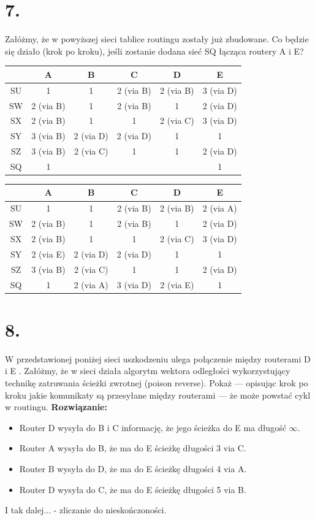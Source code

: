 \documentclass{article}
\begin{document}
\section*{7.}
Załóżmy, że w powyższej sieci tablice routingu zostały już zbudowane. Co będzie się działo (krok po kroku), jeśli zostanie dodana sieć SQ łącząca routery A i E?
\newline
\begin{tabular}{ |c|c|c|c|c|c| }
    \hline
    & A & B & C & D & E \\ \hline
    SU & 1 & 1 & 2 (via B) & 2 (via B) & 3 (via D) \\ \hline
    SW & 2 (via B) & 1 & 2 (via B) & 1 & 2 (via D) \\ \hline
    SX & 2 (via B) & 1 & 1 & 2 (via C) & 3 (via D) \\ \hline
    SY & 3 (via B) & 2 (via D) & 2 (via D) & 1 & 1 \\ \hline
    SZ & 3 (via B) & 2 (via C) & 1 & 1 & 2 (via D) \\ \hline
    SQ & 1 &  &  &  & 1 \\
    \hline
\end{tabular}
\newline
\begin{tabular}{ |c|c|c|c|c|c| }
    \hline
    & A & B & C & D & E \\ \hline
    SU & 1 & 1 & 2 (via B) & 2 (via B) & 2 (via A) \\ \hline
    SW & 2 (via B) & 1 & 2 (via B) & 1 & 2 (via D) \\ \hline
    SX & 2 (via B) & 1 & 1 & 2 (via C) & 3 (via D) \\ \hline
    SY & 2 (via E) & 2 (via D) & 2 (via D) & 1 & 1 \\ \hline
    SZ & 3 (via B) & 2 (via C) & 1 & 1 & 2 (via D) \\ \hline
    SQ & 1 & 2 (via A) & 3 (via D) & 2 (via E) & 1 \\
    \hline
\end{tabular}

\section*{8.}
W przedstawionej poniżej sieci uszkodzeniu ulega połączenie między routerami D i E . Załóżmy,
że w sieci działa algorytm wektora odległości wykorzystujący technikę zatruwania ścieżki zwrotnej
(poison reverse). Pokaż — opisując krok po kroku jakie komunikaty są przesyłane między routerami
— że może powstać cykl w routingu.
\newline
\textbf{Rozwiązanie:}
\begin{itemize}
    \item Router D wysyła do B i C informację, że jego ścieżka do E ma długość $\infty$.
    \item Router A wysyła do B, że ma do E ścieżkę długości 3 via C.
    \item Router B wysyła do D, że ma do E ścieżkę długości 4 via A.
    \item Router D wysyła do C, że ma do E ścieżkę długości 5 via B.
\end{itemize}
I tak dalej... - zliczanie do nieskończoności.
\end{document}
